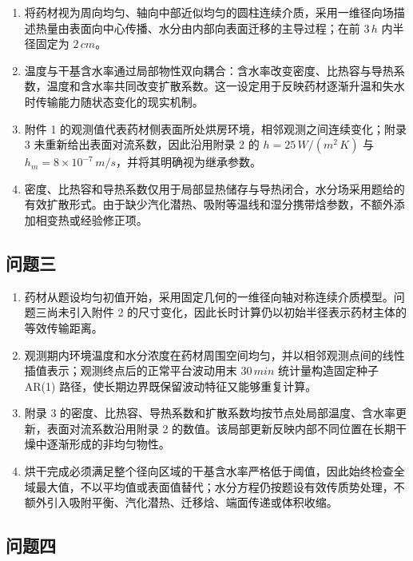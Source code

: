 \documentclass[withoutpreface,bwprint]{cumcmthesis}
\begin{document}
\begin{enumerate}
  \item 将药材视为周向均匀、轴向中部近似均匀的圆柱连续介质，采用一维径向场描述热量由表面向中心传播、水分由内部向表面迁移的主导过程；在前 $3\,\si{h}$ 内半径固定为 $2\,\si{cm}$。
  \item 温度与干基含水率通过局部物性双向耦合：含水率改变密度、比热容与导热系数，温度和含水率共同改变扩散系数。这一设定用于反映药材逐渐升温和失水时传输能力随状态变化的现实机制。
  \item 附件 1 的观测值代表药材侧表面所处烘房环境，相邻观测之间连续变化；附录 3 未重新给出表面对流系数，因此沿用附录 2 的 $h=25\,\si{W/(m^2\,K)}$ 与 $h_m=8\times10^{-7}\,\si{m/s}$，并将其明确视为继承参数。
  \item 密度、比热容和导热系数仅用于局部显热储存与导热闭合，水分场采用题给的有效扩散形式。由于缺少汽化潜热、吸附等温线和湿分携带焓参数，不额外添加相变热或经验修正项。
\end{enumerate}

\subsection{问题三}

\begin{enumerate}
  \item 药材从题设均匀初值开始，采用固定几何的一维径向轴对称连续介质模型。问题三尚未引入附件 2 的尺寸变化，因此长时计算仍以初始半径表示药材主体的等效传输距离。
  \item 观测期内环境温度和水分浓度在药材周围空间均匀，并以相邻观测点间的线性插值表示；观测终点后的正常平台波动用末 $30\,\si{min}$ 统计量构造固定种子 AR(1) 路径，使长期边界既保留波动特征又能够重复计算。
  \item 附录 3 的密度、比热容、导热系数和扩散系数均按节点处局部温度、含水率更新，表面对流系数沿用附录 2 的数值。该局部更新反映内部不同位置在长期干燥中逐渐形成的非均匀物性。
  \item 烘干完成必须满足整个径向区域的干基含水率严格低于阈值，因此始终检查全域最大值，不以平均值或表面值替代；水分方程仍按题设有效传质势处理，不额外引入吸附平衡、汽化潜热、迁移焓、端面传递或体积收缩。
\end{enumerate}

\subsection{问题四}
\end{document}
